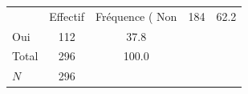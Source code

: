 {
\def\sym#1{\ifmmode^{#1}\else\(^{#1}\)\fi}
\begin{tabular}{l*{1}{cc}}
\toprule
            &    Effectif&Fréquence (%
\midrule
Non         &         184&        62.2\\
Oui         &         112&        37.8\\
Total       &         296&       100.0\\
\midrule
\(N\)       &         296&            \\
\bottomrule
\end{tabular}
}
